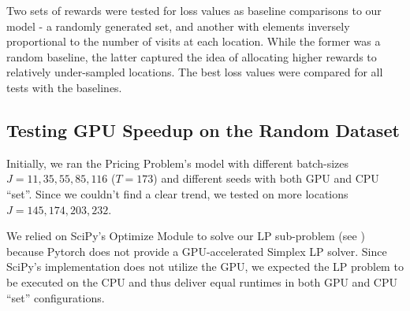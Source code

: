 Two sets of rewards were tested for loss values as baseline comparisons to our model - a randomly generated set, and another with elements inversely proportional to the number of visits at each location. While the former was a random baseline, the latter captured the idea of allocating higher rewards to relatively under-sampled locations. The best loss values were compared for all tests with the baselines.

\subsection{Testing GPU Speedup on the Random Dataset} \label{sec:Pricing Problem-Testing GPU Speedup on the Random Dataset}
Initially, we ran the Pricing Problem's model with different batch-sizes $J = 11, 35, 55, 85, 116$ ($T = 173$) and different seeds with both GPU and CPU ``set''. Since we couldn't find a clear trend, we tested on more locations $J = 145, 174, 203, 232$.

We relied on SciPy's Optimize Module to solve our LP sub-problem (see ) because Pytorch does not provide a GPU-accelerated Simplex LP solver. Since SciPy's implementation does not utilize the GPU, we expected the LP problem to be executed on the CPU and thus deliver equal runtimes in both GPU and CPU ``set'' configurations.